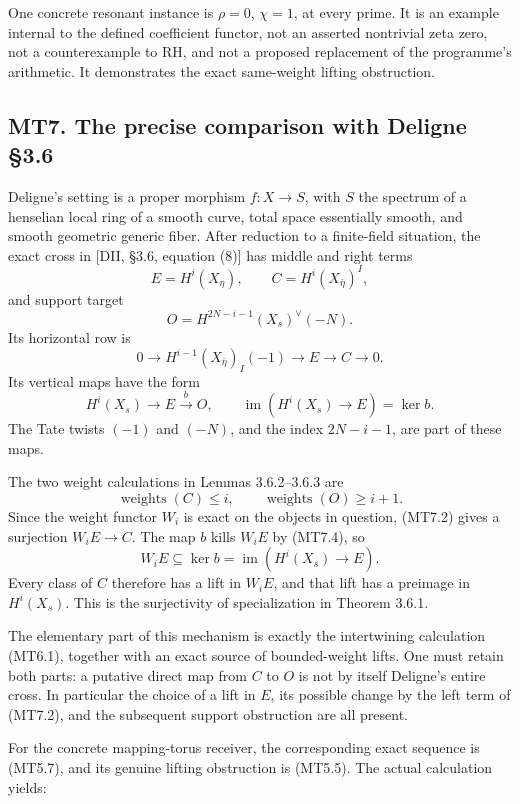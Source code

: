 One concrete resonant instance is \(\rho=0\), \(\chi=1\), at every
prime. It is an example internal to the defined coefficient functor, not
an asserted nontrivial zeta zero, not a counterexample to RH, and not a
proposed replacement of the programme's arithmetic. It demonstrates the
exact same-weight lifting obstruction.

\subsection{MT7. The precise comparison with Deligne
§3.6}\label{mt7.-the-precise-comparison-with-deligne-3.6}

Deligne's setting is a proper morphism \(f:X\to S\), with \(S\) the
spectrum of a henselian local ring of a smooth curve, total space
essentially smooth, and smooth geometric generic fiber. After reduction
to a finite-field situation, the exact cross in {[}DII, §3.6, equation
(8){]} has middle and right terms \[
 E=H^i(X_\eta),\qquad
 C=H^i(X_{\bar\eta})^I,
\] and support target \[
 O=H^{2N-i-1}(X_s)^\vee(-N).
\tag{MT7.1}
\] Its horizontal row is \[
 0\longrightarrow H^{i-1}(X_{\bar\eta})_I(-1)
 \longrightarrow E\longrightarrow C\longrightarrow0.
\tag{MT7.2}
\] Its vertical maps have the form \[
 H^i(X_s)\longrightarrow E\xrightarrow{b}O,
 \qquad
 \operatorname{im}(H^i(X_s)\to E)=\ker b.
\tag{MT7.3}
\] The Tate twists \((-1)\) and \((-N)\), and the index \(2N-i-1\), are
part of these maps.

The two weight calculations in Lemmas 3.6.2--3.6.3 are \[
 \operatorname{weights}(C)\le i,\qquad
 \operatorname{weights}(O)\ge i+1.
\tag{MT7.4}
\] Since the weight functor \(W_i\) is exact on the objects in question,
(MT7.2) gives a surjection \(W_iE\to C\). The map \(b\) kills \(W_iE\)
by (MT7.4), so \[
 W_iE\subseteq\ker b
   =\operatorname{im}(H^i(X_s)\to E).
\tag{MT7.5}
\] Every class of \(C\) therefore has a lift in \(W_iE\), and that lift
has a preimage in \(H^i(X_s)\). This is the surjectivity of
specialization in Theorem 3.6.1.

The elementary part of this mechanism is exactly the intertwining
calculation (MT6.1), together with an exact source of bounded-weight
lifts. One must retain both parts: a putative direct map from \(C\) to
\(O\) is not by itself Deligne's entire cross. In particular the choice
of a lift in \(E\), its possible change by the left term of (MT7.2), and
the subsequent support obstruction are all present.

For the concrete mapping-torus receiver, the corresponding exact
sequence is (MT5.7), and its genuine lifting obstruction is (MT5.5). The
actual calculation yields:

